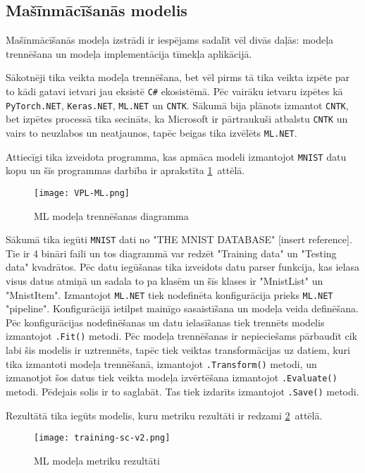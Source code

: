 \subsection{Mašīnmācīšanās modelis}

    Mašīnmācīšanās modeļa izstrādi ir iespējams sadalīt vēl divās daļās: modeļa trennēšana un modeļa
    implementācija tīmekļa aplikācijā.

    Sākotnēji tika veikta modeļa trennēšana, bet vēl pirms tā tika veikta izpēte par to kādi gatavi
    ietvari jau eksistē \texttt{C\#} ekosistēmā. Pēc vairāku ietvaru izpētes kā \texttt{PyTorch.NET},
    \texttt{Keras.NET}, \texttt{ML.NET} un \texttt{CNTK}. Sākumā bija plānots izmantot \texttt{CNTK},
    bet izpētes processā tika secināts, ka Microsoft ir pārtraukuši atbalstu \texttt{CNTK} un vairs
    to neuzlabos un neatjaunos, tapēc beigas tika izvēlēts \texttt{ML.NET}.

    Attiecīgi tika izveidota programma, kas apmāca modeli izmantojot \texttt{MNIST} datu kopu un
    šīs programmas darbība ir aprakstīta \ref{ml:train}~attēlā.

    \begin{figure}[H]
        \centering
        \texttt{[image: VPL-ML.png]}
        \caption{ML modeļa trennēšanas diagramma}
        \label{ml:train}
    \end{figure}

    Sākumā tika iegūti \texttt{MNIST} dati no "THE MNIST DATABASE" [insert reference]. Tie ir 4 bināri
    faili un tos diagrammā var redzēt "Training data" un "Testing data" kvadrātos. Pēc datu iegūšanas
    tika izveidots datu parser funkcija, kas ielasa visus datus atmiņā un sadala to pa klasēm un šīs
    klases ir "MnistList" un "MnistItem". Izmantojot \texttt{ML.NET} tiek nodefinēta konfigurācija
    prieks \texttt{ML.NET} "pipeline". Konfigurācijā ietilpst mainīgo sasaistīšana un modeļa veida
    definēšana. Pēc konfigurācijas nodefinēšanas un datu ielasīšanas tiek trennēts modelis izmantojot
    \texttt{.Fit()} metodi. Pēc modeļa trennēšanas ir nepieciešams pārbaudīt cik labi šis
    modelis ir uztrennēts, tapēc tiek veiktas transformācijas uz datiem, kuri tika izmantoti modeļa
    trennēšanā, izmantojot \texttt{.Transform()} metodi, un izmanotjot šos datus tiek
    veikta modeļa izvērtēšana izmantojot \texttt{.Evaluate()} metodi. Pēdejais solis ir
    to saglabāt. Tas tiek izdarīts izmantojot \texttt{.Save()} metodi.

    Rezultātā tika iegūts modelis, kuru metriku rezultāti ir redzami \ref{ml:metrics}~attēlā.

    \begin{figure}[H]
        \centering
        \texttt{[image: training-sc-v2.png]}
        \caption{ML modeļa metriku rezultāti}
        \label{ml:metrics}
    \end{figure}
